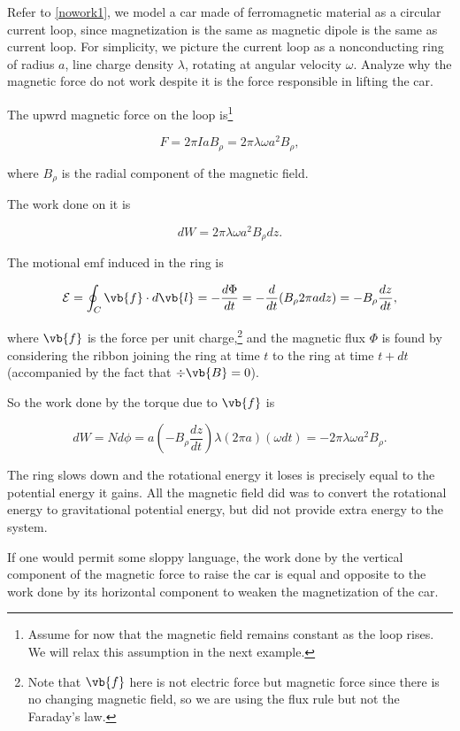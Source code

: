 \documentclass[english,a4paper,12pt]{report}
\begin{document}
{Refer to \cref{nowork1}, we model a car made of ferromagnetic material as a circular current loop, since magnetization is the same as magnetic dipole is the same as current loop. For simplicity, we picture the current loop as a nonconducting ring of radius \(a\), line charge density \(\lambda \), rotating at angular velocity \(\omega\). Analyze why the magnetic force do not work despite it is the force responsible in lifting the car.  }
{The upwrd magnetic force on the loop is\footnote{Assume for now that the magnetic field remains constant as the loop rises. We will relax this assumption in the next example.} 

\begin{equation}
    F = 2\pi I a B_{\rho } = 2\pi \lambda \omega a^2B_{\rho } , 
\end{equation}

where \(B_{\rho } \) is the radial component of the magnetic field. 

The work done on it is 

\begin{equation}
    dW = 2\pi \lambda \omega a^2B_{\rho }dz. 
\end{equation}

The motional emf induced in the ring is

\begin{equation}
    \mathcal{E} = \oint_{C} \vb{f} \cdot d\vb{l} = - \frac{d\Phi }{dt} = -\frac{d}{dt} (B_{\rho } 2\pi a dz ) = -B_{\rho } \frac{dz}{dt},   
\end{equation}

where \(\vb{f} \) is the force per unit charge,\footnote{Note that \(\vb{f} \) here is not electric force but magnetic force since there is no changing magnetic field, so we are using the flux rule but not the Faraday's law.} and the magnetic flux \(\Phi \) is found by considering the ribbon joining the ring at time \(t\) to the ring at time \(t+dt\) (accompanied by the fact that \(\div{\vb{B} } = 0 \)).    

So the work done by the torque due to \(\vb{f} \) is 

\begin{equation}
    dW = Nd\phi = a\left( -B_{\rho } \frac{dz}{dt}   \right) \lambda (2\pi a)(\omega dt) = -2\pi \lambda \omega a^2B_{\rho }. 
\end{equation}

The ring slows down and the rotational energy it loses is precisely equal to the potential energy it gains. All the magnetic field did was to convert the rotational energy to gravitational potential energy, but did not provide extra energy to the system.

If one would permit some sloppy language, the work done by the vertical component of the magnetic force to raise the car is equal and opposite to the work done by its horizontal component to weaken the magnetization of the car.


} 
\end{document}
